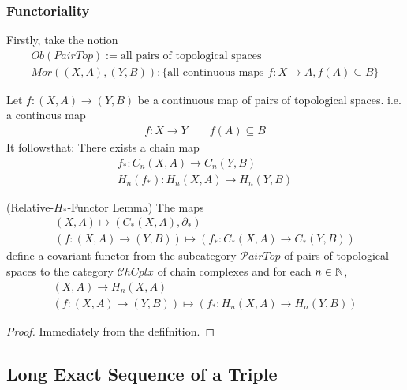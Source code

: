 \documentclass[Total.tex]{subfiles}
\begin{document}
			\subsubsection{Functoriality}
			Firstly, take the notion 
			\begin{gather*}
				Ob(PairTop):=\mbox{all pairs of topological spaces}\\
				Mor((X,A),(Y,B)):\{\mbox{all continuous maps }f:X\rightarrow A,f(A)\subseteq B\}
			\end{gather*}
			\begin{Def}
				Let $f:(X,A)\rightarrow (Y,B)$ be a continuous map of pairs of topological spaces. i.e. a continous map
				\begin{gather*}
					f:X\rightarrow Y\qquad f(A)\subseteq B
				\end{gather*}
				It followsthat: There exists a chain map
				\begin{gather*}
					f_*:C_n(X,A)\rightarrow C_n(Y,B)\\
					H_n(f_*):H_n(X,A)\rightarrow H_n(Y,B)
				\end{gather*}
			\end{Def}
			\begin{lemma}
				(Relative-$H_*$-Functor Lemma) The maps
				\begin{gather*}
					(X,A)\mapsto (C_*(X,A),\partial_*)\\
					(f:(X,A)\rightarrow (Y,B))\mapsto (f_*:C_*(X,A)\rightarrow C_*(Y,B))
				\end{gather*}
				define a covariant functor from the subcategory $\mathcal PairTop$ of pairs of topological spaces to the category $\mathcal ChCplx$ of chain complexes and for each $n\in \mathbb{N}$,
				\begin{gather*}
					(X,A)\rightarrow H_n(X,A)\\
					(f:(X,A)\rightarrow (Y,B))\mapsto (f_*:H_n(X,A)\rightarrow H_n(Y,B))
				\end{gather*}
			\end{lemma}
			\begin{proof}
				Immediately from the defifnition.
			\end{proof}
		
			
			\subsection{Long Exact Sequence of a Triple}
\end{document}
